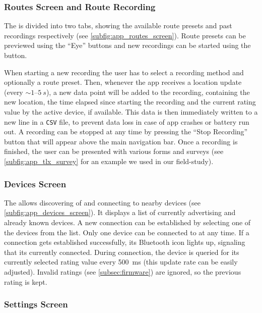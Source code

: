\subsubsection*{Routes Screen and Route Recording}

The \routesscreen is divided into two tabs, showing the available route presets and past recordings respectively (see \autoref{subfig:app_routes_screen}).
Route presets can be previewed using the “Eye” buttons and new recordings can be started using the \raisebox{0.1em}{\textbf{+}} button.

When starting a new recording the user has to select a recording method and optionally a route preset.
Then, whenever the app receives a location update (every $\sim1$--$\SI{5}{s}$), a new data point will be added to the recording, containing the new location, the time elapsed since starting the recording and the current rating value by the active \likertshift device, if available.
This data is then immediately written to a new line in a \texttt{CSV} file, to prevent data loss in case of app crashes or battery run out.
A recording can be stopped at any time by pressing the “Stop Recording” button that will appear above the main navigation bar.
Once a recording is finished, the user can be presented with various forms and surveys (see \autoref{subfig:app_tlx_survey} for an example we used in our field-study).

\subsubsection*{Devices Screen}

The \devicesscreen allows discovering of and connecting to nearby \likertshift devices (see \autoref{subfig:app_devices_screen}).
It displays a list of currently advertising and already known devices.
A new connection can be established by selecting one of the devices from the list.
Only one device can be connected to at any time.
If a connection gets established successfully, its Bluetooth icon lights up, signaling that its currently connected.
During connection, the \likertshift device is queried for its currently selected rating value every \SI{500}{ms} (this update rate can be easily adjusted).
Invalid ratings (see \autoref{subsec:firmware}) are ignored, so the previous rating is kept.

\subsubsection*{Settings Screen}

